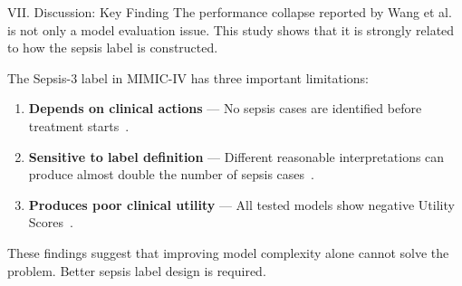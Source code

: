 \begin{frame}{VII. Discussion: Key Finding}
The performance collapse reported by Wang et al.~\cite{wang2025srpm} is not
only a model evaluation issue. This study shows that it is strongly related
to how the sepsis label is constructed.

\vspace{6pt}
The Sepsis-3 label in MIMIC-IV has three important limitations:
\begin{enumerate}
  \item \textbf{Depends on clinical actions} --- No sepsis cases are
        identified before treatment starts~\cite{kamran2024evaluation}.
  \item \textbf{Sensitive to label definition} --- Different reasonable
        interpretations can produce almost double the number of sepsis
        cases~\cite{cohen2024subtle}.
  \item \textbf{Produces poor clinical utility} --- All tested models show
        negative Utility Scores~\cite{wang2025srpm}.
\end{enumerate}

\vspace{6pt}
\begin{alertblock}{}
  \centering These findings suggest that improving model complexity alone
  cannot solve the problem. Better sepsis label design is required.
\end{alertblock}
\end{frame}


